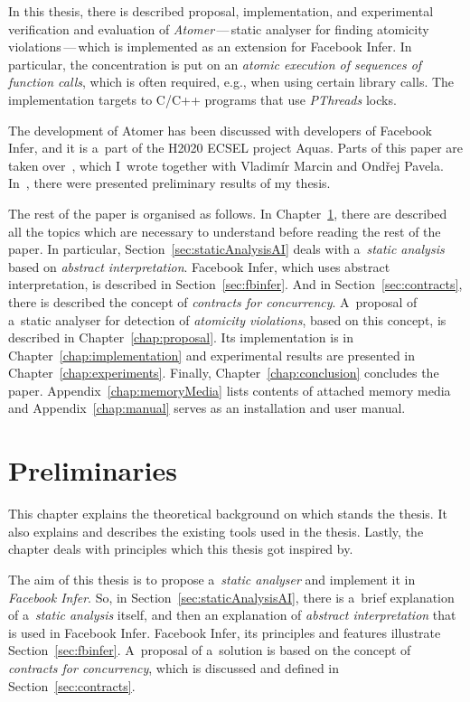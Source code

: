 In this thesis, there is described proposal, implementation, and experimental
verification and evaluation of \emph{Atomer}\,---\,static analyser for
finding atomicity violations\,---\,which is implemented as an extension for
Facebook Infer. In particular, the concentration is put on an
\emph{atomic execution of sequences of function calls}, which is often
required, e.g., when using certain library calls. The implementation targets
to C/C++ programs that use \emph{PThreads} locks.

The development of Atomer has been discussed with developers of
Facebook Infer, and it is a~part of the H2020 ECSEL project Aquas. Parts
of this paper are taken over~\cite{excel2019FBInfer}, which I~wrote
together with Vladimír Marcin and Ondřej Pavela. In~\cite{excel2019FBInfer},
there were presented preliminary results of my thesis.

The rest of the paper is organised as follows. In
Chapter~\ref{chap:preliminaries}, there are described all the topics
which are necessary to understand before reading the rest of the paper. In
particular, Section~\ref{sec:staticAnalysisAI} deals with
a~\emph{static analysis} based on \emph{abstract interpretation}.
Facebook Infer, which uses abstract interpretation, is described in
Section~\ref{sec:fbinfer}. And in Section~\ref{sec:contracts}, there is
described the concept of \emph{contracts for concurrency}. A~proposal of a~static
analyser for detection of \emph{atomicity violations}, based on this concept, is
described in Chapter~\ref{chap:proposal}. Its implementation is in
Chapter~\ref{chap:implementation} and experimental results are presented
in Chapter~\ref{chap:experiments}. Finally, Chapter~\ref{chap:conclusion}
concludes the paper. Appendix~\ref{chap:memoryMedia} lists contents
of attached memory media and Appendix~\ref{chap:manual} serves as an
installation and user manual.



\chapter{Preliminaries}
\label{chap:preliminaries}

This chapter explains the theoretical background on which stands the
thesis. It also explains and describes the existing tools used in the
thesis. Lastly, the chapter deals with principles which this thesis
got inspired by.

The aim of this thesis is to propose a~\emph{static analyser} and implement
it in \emph{Facebook Infer}. So, in Section~\ref{sec:staticAnalysisAI},
there is a~brief explanation of a~\emph{static analysis} itself, and then an
explanation of \emph{abstract interpretation} that is used in Facebook Infer.
Facebook Infer, its principles and features illustrate
Section~\ref{sec:fbinfer}. A~proposal of a~solution is based on the
concept of \emph{contracts for concurrency}, which is discussed and defined
in Section~\ref{sec:contracts}.


